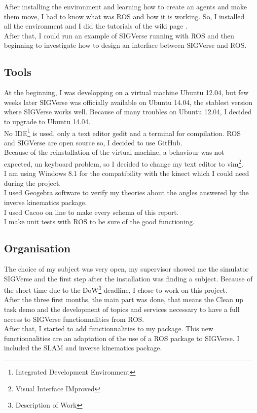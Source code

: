After installing the environment and learning how to create an agents and make them move, I had to know what was ROS and how it is working. So, I installed all the environment and I did the tutorials of the wiki page \cite{ROSWiki}.\\
After that, I could run an example of SIGVerse running with ROS and then beginning to investigate how to design an interface between SIGVerse and ROS.

\subsection{Tools}
At the beginning, I was developping on a virtual machine Ubuntu 12.04, but few weeks later SIGVerse was officially available on Ubuntu 14.04, the stablest version where SIGVerse works well. Because of many troubles on Ubuntu 12.04, I decided to upgrade to Ubuntu 14.04.\\
No IDE\footnote{Integrated Development Environment} is used, only a text editor gedit and a terminal for compilation. ROS and SIGVerse are open source so, I decided to use GitHub.\\
Because of the reinstallation of the virtual machine, a behaviour was not expected, un keyboard problem, so I decided to change my text editor to vim\footnote{Visual Interface IMproved}.\\ 
I am using Windows 8.1 for the compatibility with the kinect which I could need during the project.\\

I used Geogebra software to verify my theories about the angles answered by the inverse kinematics package.\\
I used Cacoo on line to make every schema of this report.\\
I make unit tests with ROS to be sure of the good functioning.

\subsection{Organisation}
The choice of my subject was very open, my supervisor showed me the simulator SIGVerse and the first step after the installation was finding a subject. Because of the short time due to the DoW\footnote{Description of Work} deadline, I chose to work on this project.\\
After the three first months, the main part was done, that means the Clean up task demo and the development of topics and services necessary to have a full access to SIGVerse functionnalities from ROS.\\
After that, I started to add functionnalities to my package. This new functionnalities are an adaptation of the use of a ROS package to SIGVerse. I included the SLAM and inverse kinematics package.\\

